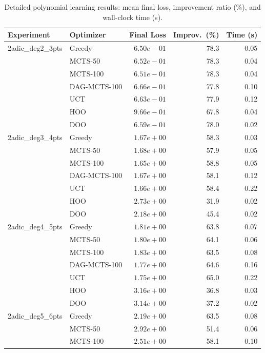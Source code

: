 
\begin{table}[ht]
\centering
\caption{Detailed polynomial learning results: mean final loss, improvement ratio (\%), and wall-clock time (s).}
\label{tab:poly-learning-detailed}
\begin{tabular}{llrrr}
\toprule
Experiment & Optimizer & Final Loss & Improv.~(\%) & Time (s) \\
\midrule
2adic\_deg2\_3pts & Greedy & $6.50e-01$ & 78.3 & 0.05 \\
 & MCTS-50 & $6.52e-01$ & 78.3 & 0.04 \\
 & MCTS-100 & $6.51e-01$ & 78.3 & 0.04 \\
 & DAG-MCTS-100 & $6.66e-01$ & 77.8 & 0.10 \\
 & UCT & $6.63e-01$ & 77.9 & 0.12 \\
 & HOO & $9.66e-01$ & 67.8 & 0.04 \\
 & DOO & $6.59e-01$ & 78.0 & 0.02 \\
\midrule
2adic\_deg3\_4pts & Greedy & $1.67e+00$ & 58.3 & 0.03 \\
 & MCTS-50 & $1.68e+00$ & 57.9 & 0.05 \\
 & MCTS-100 & $1.65e+00$ & 58.8 & 0.05 \\
 & DAG-MCTS-100 & $1.67e+00$ & 58.1 & 0.12 \\
 & UCT & $1.66e+00$ & 58.4 & 0.22 \\
 & HOO & $2.73e+00$ & 31.9 & 0.02 \\
 & DOO & $2.18e+00$ & 45.4 & 0.02 \\
\midrule
2adic\_deg4\_5pts & Greedy & $1.81e+00$ & 63.8 & 0.07 \\
 & MCTS-50 & $1.80e+00$ & 64.1 & 0.06 \\
 & MCTS-100 & $1.83e+00$ & 63.5 & 0.08 \\
 & DAG-MCTS-100 & $1.77e+00$ & 64.6 & 0.16 \\
 & UCT & $1.75e+00$ & 65.0 & 0.22 \\
 & HOO & $3.16e+00$ & 36.8 & 0.03 \\
 & DOO & $3.14e+00$ & 37.2 & 0.02 \\
\midrule
2adic\_deg5\_6pts & Greedy & $2.19e+00$ & 63.5 & 0.08 \\
 & MCTS-50 & $2.92e+00$ & 51.4 & 0.06 \\
 & MCTS-100 & $2.51e+00$ & 58.1 & 0.10 \\

\end{tabular}
\end{table}

